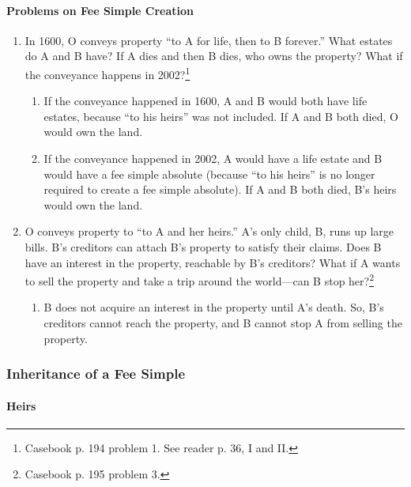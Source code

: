 \paragraph{Problems on Fee Simple Creation}

\begin{enumerate}
    \item In 1600, O conveys property ``to A for life, then to B forever.'' 
    What estates do A and B have? If A dies and then B dies, who owns the 
    property? What if the conveyance happens in 2002?\footnote{Casebook p. 194 
    problem 1. See reader p. 36, I and II.}
    \begin{enumerate}
        \item If the conveyance happened in 1600, A and B would both have life 
        estates, because ``to his heirs'' was not included. If A and B both 
        died, O would own the land.
        \item If the conveyance happened in 2002, A would have a life estate 
        and B would have a fee simple absolute (because ``to his heirs'' is no 
        longer required to create a fee simple absolute). If A and B both 
        died, B's heirs would own the land.
    \end{enumerate}
    \item O conveys property to ``to A and her heirs.'' A's only child, B, 
    runs up large bills. B's creditors can attach B's property to satisfy 
    their claims. Does B have an interest in the property, reachable by B's 
    creditors? What if A wants to sell the property and take a trip around the 
    world---can B stop her?\footnote{Casebook p. 195 problem 3.}
    \begin{enumerate}
        \item B does not acquire an interest in the property until A's death. 
        So, B's creditors cannot reach the property, and B cannot stop A from 
        selling the property.
    \end{enumerate}

\end{enumerate}

\subsubsection{Inheritance of a Fee Simple}

\paragraph{Heirs}

